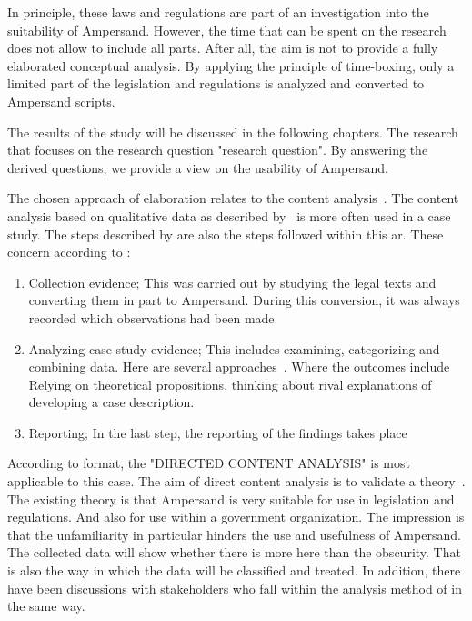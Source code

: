 In principle, these laws and regulations are part of an investigation into the suitability of Ampersand.
However, the time that can be spent on the research does not allow to include all parts.
After all, the aim is not to provide a fully elaborated conceptual analysis.
By applying the principle of time-boxing, only a limited part of the legislation and regulations is analyzed and converted to Ampersand scripts.

The results of the study will be discussed in the following chapters.
The research that focuses on the research question "\acrlong{research question}".
By answering the derived questions, we provide a view on the usability of Ampersand.

The chosen approach of elaboration relates to the content analysis~\citep{kohlbacher_use_2006}.
The content analysis based on qualitative data as described by~\cite{kohlbacher_use_2006} is more often used in a case study.
The steps described by \cite{kohlbacher_use_2006} are also the steps followed within this \acrshort{ar}.
These concern according to \cite{kohlbacher_use_2006}:
\begin{enumerate}
    \item Collection evidence;
    \newline This was carried out by studying the legal texts and converting them in part to Ampersand.
    During this conversion, it was always recorded which observations had been made.
    \item Analyzing case study evidence;
    \newline This includes examining, categorizing and combining data.
    Here are several approaches~\citep{hsieh_three_2005}.
    Where the outcomes include Relying on theoretical propositions, thinking about rival explanations of developing a case description.
    \item Reporting;
    \newline In the last step, the reporting of the findings takes place
\end{enumerate}
According to \cite{hsieh_three_2005} format, the "DIRECTED CONTENT ANALYSIS" is most applicable to this case.
The aim of direct content analysis is to validate a theory~\citep{hsieh_three_2005}.
The existing theory is that Ampersand is very suitable for use in legislation and regulations.
And also for use within a government organization.
The impression is that the unfamiliarity in particular hinders the use and usefulness of Ampersand.
The collected data will show whether there is more here than the obscurity.
That is also the way in which the data will be classified and treated.
In addition, there have been discussions with stakeholders who fall within the analysis method of \cite{hsieh_three_2005} in the same way.